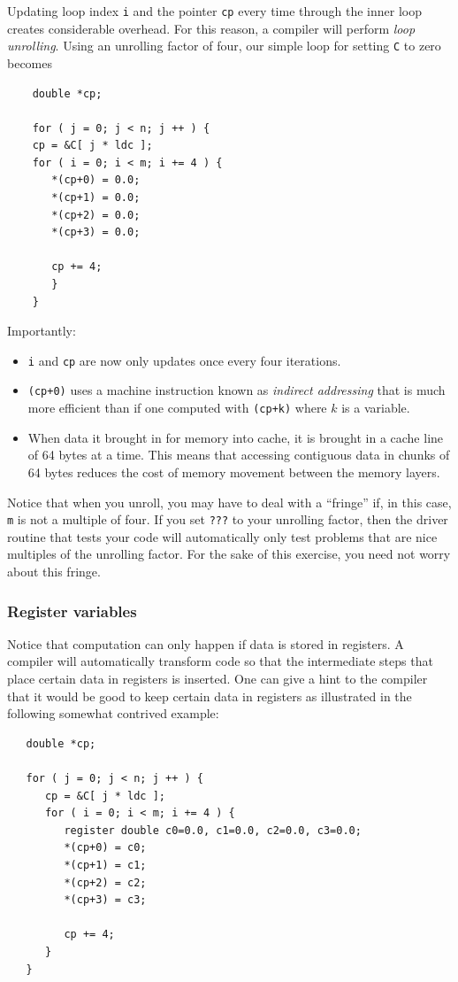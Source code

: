 Updating loop index {\tt i} and the pointer {\tt cp} every time through the inner loop creates considerable overhead.  For this reason, a compiler will perform {\em loop unrolling}.  Using an unrolling factor of four, our simple loop for setting {\tt C} to zero becomes
 \begin{verbatim}
    double *cp;
 
    for ( j = 0; j < n; j ++ ) {
    cp = &C[ j * ldc ];           
    for ( i = 0; i < m; i += 4 ) {                
       *(cp+0) = 0.0; 
       *(cp+1) = 0.0; 
       *(cp+2) = 0.0; 
       *(cp+3) = 0.0;
       
       cp += 4;                
       }                                           
    }                                              
 \end{verbatim}
Importantly:
\begin{itemize}
	\item {\tt i} and {\tt cp} are now only updates once every four iterations.
	\item {\tt *(cp+0)} uses a machine instruction known as {\em indirect addressing} that is much more efficient than if one computed with {\tt *(cp+k)} where $ k $ is a variable.  
	\item
	When data it brought in for memory into cache, it is brought in a cache line of 64 bytes at a time.  This means that accessing contiguous data in chunks of 64 bytes reduces the cost of memory movement between the memory layers.
\end{itemize}
Notice that when you unroll, you may have to deal with a ``fringe'' if, in this case, {\tt m} is not a multiple of four.  If you set {\tt ???} to your unrolling factor, then the driver routine that tests your code will automatically only test problems that are nice multiples of the unrolling factor.  For the sake of this exercise, you need not worry about this fringe.

\subsubsection{Register variables}

Notice that computation can only happen if data is stored in registers.  A compiler will automatically transform code so that the intermediate steps that place certain data in registers is inserted.  One can give a hint to the compiler that it would be good to keep certain data in registers as illustrated in the following somewhat contrived example:
\begin{verbatim}
   double *cp;

   for ( j = 0; j < n; j ++ ) {
      cp = &C[ j * ldc ];           
      for ( i = 0; i < m; i += 4 ) {
         register double c0=0.0, c1=0.0, c2=0.0, c3=0.0;                
         *(cp+0) = c0; 
         *(cp+1) = c1; 
         *(cp+2) = c2; 
         *(cp+3) = c3;

         cp += 4;                
      }                                           
   }       
\end{verbatim}

